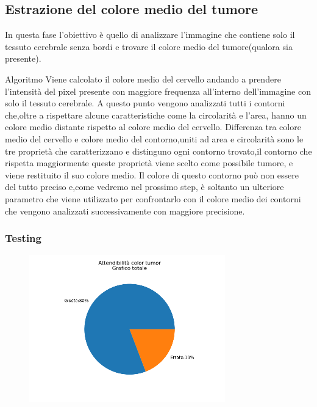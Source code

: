 \documentclass{article}
\begin{document}
\hfill \break

\subsection{Estrazione del colore medio del tumore}
In questa fase l'obiettivo è quello di analizzare l'immagine che contiene solo il tessuto cerebrale senza bordi e trovare il colore medio del tumore(qualora sia presente).

\begin{my theorem}{Algoritmo}
    Viene calcolato il colore medio del cervello andando a prendere l'intensità del pixel presente con maggiore frequenza all'interno dell'immagine con solo il tessuto cerebrale.
    A questo punto vengono analizzati tutti i contorni che,oltre a rispettare alcune caratteristiche come la circolarità e l'area, hanno un colore medio distante rispetto al colore medio del cervello.
    Differenza tra colore medio del cervello e colore medio del contorno,uniti ad area e circolarità sono le tre proprietà che caratterizzano e distinguno ogni contorno trovato,il contorno che rispetta maggiormente queste proprietà viene scelto come possibile tumore, e viene restituito il suo colore medio.
    Il colore di questo contorno può non essere del tutto preciso e,come vedremo nel prossimo step, è soltanto un ulteriore parametro che viene utilizzato per confrontarlo con il colore medio dei contorni che vengono analizzati successivamente con maggiore precisione.
\end{my theorem}

\subsubsection{Testing}

\begin{figure}
    \includegraphics[width=8.5cm]{images/ct.png}
\end{figure}
\end{document}
